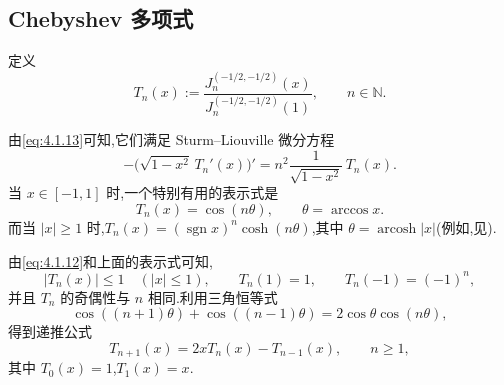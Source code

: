 \subsection{Chebyshev 多项式}\label{sec:4.3.1}

\begin{definition*}
定义
\[
  T_n(x):=\frac{J_n^{(-1/2,-1/2)}(x)}{J_n^{(-1/2,-1/2)}(1)},\qquad n\in\mathbb N.
\]
\end{definition*}
由\eqref{eq:4.1.13}可知,它们满足 Sturm--Liouville 微分方程
\begin{equation}\label{eq:4.3.1}
  -\bigl(\sqrt{1-x^2}\,T_n'(x)\bigr)'
    =n^2\frac{1}{\sqrt{1-x^2}}\,T_n(x).
\end{equation}
当 \(x\in[-1,1]\) 时,一个特别有用的表示式是
\begin{equation}\label{eq:4.3.2}
  T_n(x)=\cos(n\theta),\qquad\theta=\arccos x.
\end{equation}
而当 \(|x|\ge1\) 时,\(T_n(x)=(\operatorname{sgn}x)^n\cosh(n\theta)\),其中 \(\theta=\operatorname{arcosh}|x|\)(例如,见).

由\eqref{eq:4.1.12}和上面的表示式可知,
\begin{equation}\label{eq:4.3.3}
  |T_n(x)|\le1\quad(|x|\le1),\qquad T_n(1)=1,\qquad T_n(-1)=(-1)^n,
\end{equation}
并且 \(T_n\) 的奇偶性与 \(n\) 相同.利用三角恒等式
\[
  \cos((n+1)\theta)+\cos((n-1)\theta)=2\cos\theta\cos(n\theta),
\]
得到递推公式
\begin{equation}\label{eq:4.3.4}
  T_{n+1}(x)=2xT_n(x)-T_{n-1}(x),\qquad n\ge1,
\end{equation}
其中 \(T_0(x)=1\),\(T_1(x)=x\).

